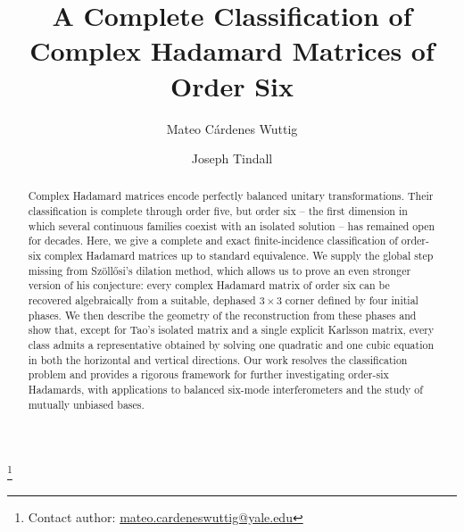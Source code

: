 \newcommand{\MainCiteHaagerupSzollosi}{%
  ~\cite{Haagerup1997,Szollosi2012FourParameter}}
\newcommand{\MainCiteSzollosi}{~\cite{Szollosi2012FourParameter}}
\newcommand{\MainCiteBasu}{~\cite{BasuPollackRoy2006}}
\newcommand{\MainCiteBondal}{~\cite{BondalZhdanovskiy2016}}

\title{A Complete Classification of Complex Hadamard Matrices of Order Six}

\author{Mateo C\'ardenes Wuttig}
\thanks{Contact author: \href{mailto:mateo.cardeneswuttig@yale.edu}%
{mateo.cardeneswuttig@yale.edu}}
\author{Joseph Tindall}

\ifdefined\SupplementOnly
\maketitle
\tableofcontents
\clearpage
\hypertarget{main-article-numbering}{}
\else
\begin{abstract}
Complex Hadamard matrices encode perfectly balanced unitary transformations.
Their classification is complete through order five, but order six -- the first dimension in which several continuous families coexist with an isolated solution -- has remained open for decades. Here, we give a complete and exact finite-incidence classification of order-six complex Hadamard matrices up to standard equivalence.
We supply the global step missing from Sz\"oll\H{o}si's dilation method, which allows us to prove an even stronger version of his conjecture: every complex Hadamard matrix of order six can be recovered algebraically from a suitable, dephased $3 \times 3$ corner defined by four initial phases.
We then describe the geometry of the reconstruction from these phases and show that, except for Tao's isolated matrix and a single explicit Karlsson matrix, every class admits a representative obtained by solving one quadratic and one cubic equation in both the horizontal and vertical directions.
Our work resolves the classification problem and provides a rigorous framework for further investigating order-six Hadamards, with applications to balanced six-mode interferometers and the study of mutually unbiased bases.
\end{abstract}
\maketitle

